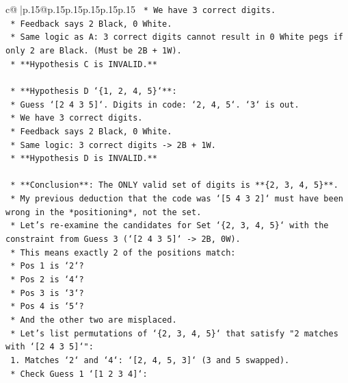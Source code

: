 \documentclass{article}
\begin{document}
{\begin{supertabular}{c@{$\;$}|p{.15\linewidth}@{}p{.15\linewidth}p{.15\linewidth}p{.15\linewidth}p{.15\linewidth}p{.15\linewidth}}
{{{\texttt{                *   We have 3 correct digits.} \\
\texttt{                *   Feedback says 2 Black, 0 White.} \\
\texttt{                *   Same logic as A: 3 correct digits cannot result in 0 White pegs if only 2 are Black. (Must be 2B + 1W).} \\
\texttt{                *   **Hypothesis C is INVALID.**} \\
\\ 
\texttt{            *   **Hypothesis D `\{1, 2, 4, 5\}`**:} \\
\texttt{                *   Guess `{[}2 4 3 5{]}`. Digits in code: `2, 4, 5`. `3` is out.} \\
\texttt{                *   We have 3 correct digits.} \\
\texttt{                *   Feedback says 2 Black, 0 White.} \\
\texttt{                *   Same logic: 3 correct digits {-}> 2B + 1W.} \\
\texttt{                *   **Hypothesis D is INVALID.**} \\
\\ 
\texttt{    *   **Conclusion**: The ONLY valid set of digits is **\{2, 3, 4, 5\}**.} \\
\texttt{    *   My previous deduction that the code was `{[}5 4 3 2{]}` must have been wrong in the *positioning*, not the set.} \\
\texttt{    *   Let's re{-}examine the candidates for Set `\{2, 3, 4, 5\}` with the constraint from Guess 3 (`{[}2 4 3 5{]}` {-}> 2B, 0W).} \\
\texttt{        *   This means exactly 2 of the positions match:} \\
\texttt{            *   Pos 1 is `2`?} \\
\texttt{            *   Pos 2 is `4`?} \\
\texttt{            *   Pos 3 is `3`?} \\
\texttt{            *   Pos 4 is `5`?} \\
\texttt{        *   And the other two are misplaced.} \\
\texttt{        *   Let's list permutations of `\{2, 3, 4, 5\}` that satisfy "2 matches with `{[}2 4 3 5{]}`":} \\
\texttt{            1.  Matches `2` and `4`: `{[}2, 4, 5, 3{]}` (3 and 5 swapped).} \\
\texttt{                *   Check Guess 1 `{[}1 2 3 4{]}`:} \\
}}}
\end{supertabular}}
\end{document}
